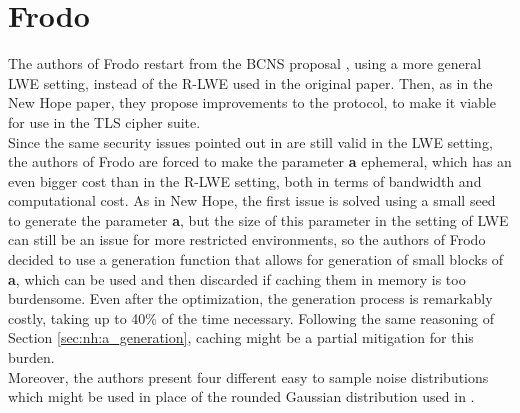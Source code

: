 \section{Frodo}\label{sec:fr}
The authors of Frodo \cite{frodo} restart from the BCNS proposal \cite{BCNS}, using a more general LWE setting, instead of the R-LWE used in the original paper. Then, as in the New Hope paper, they propose improvements to the protocol, to make it viable for use in the TLS cipher suite.\\
Since the same security issues pointed out in \cite{newhope} are still valid in the LWE setting, the authors of Frodo are forced to make the parameter \textbf{a} ephemeral, which has an even bigger cost than in the R-LWE setting, both in terms of bandwidth and computational cost. As in New Hope, the first issue is solved using a small seed to generate the parameter \textbf{a}, but the size of this parameter in the setting of LWE can still be an issue for more restricted environments, so the authors of Frodo decided to use a generation function that allows for generation of small blocks of \textbf{a}, which can be used and then discarded if caching them in memory is too burdensome. Even after the optimization, the generation process is remarkably costly, taking up to 40\% of the time necessary. Following the same reasoning of Section \ref{sec:nh:a_generation}, caching might be a partial mitigation for this burden.\\
Moreover, the authors present four different easy to sample noise distributions which might be used in place of the rounded Gaussian distribution used in \cite{BCNS}.

